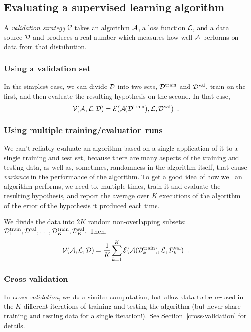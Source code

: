 \subsection{Evaluating a supervised learning algorithm}

A {\em validation strategy} $\mathcal{V}$ takes an algorithm
$\mathcal{A}$, a loss function $\mathcal{L}$, and a data source
${\cal D}$ and produces a real number which measures how well $\mathcal{A}$
performs on data from that distribution.

\subsubsection{Using a validation set}
In the simplest case, we can divide ${\cal D}$ into two sets,
${\cal D}^\text{train}$ and ${\cal D}^\text{val}$, train on the first, and
then evaluate the resulting hypothesis on the second.  In that case,
\[\mathcal{V}(\mathcal{A}, \mathcal{L}, {\cal D}) =
  \mathcal{E}(\mathcal{A}({\cal D}^\text{train}),
  \mathcal{L}, {\cal D}^\text{val})\;\;.\]

\subsubsection{Using multiple training/evaluation runs}
We can't reliably evaluate an algorithm based on a single application of it to
a single training and test set, because there are many aspects of the
training and testing data, as well as, sometimes, randomness in
the algorithm itself, that cause {\em variance} in the performance of
the algorithm.  To get a good idea of how well an algorithm
performs, we need to, multiple times, train it and evaluate the
resulting hypothesis, and report the average over
$K$ executions of the algorithm of the error of the
hypothesis it produced each time.

We divide the data into $2K$ random non-overlapping subsets:
${\cal D}_1^\text{train}, {\cal D}_1^\text{val}, \ldots,
  {\cal D}_K^\text{train}, {\cal D}_K^\text{val}.$    Then,
\[\mathcal{V}(\mathcal{A}, \mathcal{L}, {\cal D}) =
  \frac{1}{K}\sum_{k=1}^K \mathcal{E}(\mathcal{A}({\cal D}_k^\text{train}),
  \mathcal{L}, {\cal D}_k^\text{val})\;\;.\]

\subsubsection{Cross validation}
In {\em cross validation}, we do a similar computation, but allow data
to be re-used in the $K$ different iterations of training and testing
the algorithm (but never share training and testing data for a single
iteration!).  See Section~\ref{cross-validation} for details.


